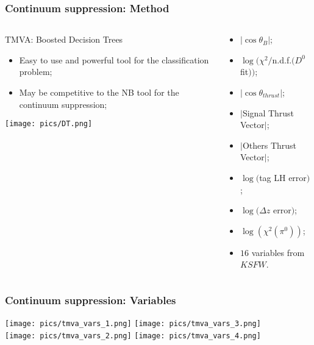 \documentclass[10 pt,compress,mathserif]{beamer}
\begin{document}
\begin{frame}[containsverbatim]
\frametitle{Continuum suppression: Method}
\begin{columns}
 \begin{column}{0.5\textwidth}
  \begin{block}{TMVA: Boosted Decision Trees}
  \begin{itemize}
   \item Easy to use and powerful tool for the classification problem;
   \item May be competitive to the NB tool for the continuum suppression;
  \end{itemize}
  \begin{center}
   \texttt{[image: pics/DT.png]}\\
  \end{center}
  \end{block}
 \end{column}
 \begin{column}{0.5\textwidth}
  \begin{itemize}
   \item $\left|\cos\theta_{B}\right|$;
   \item $\log(\chi^2/$n.d.f.$(D^0$ fit$))$;
   \item $\left|\cos\theta_{thrust}\right|$;
   \item $|$Signal Thrust Vector$|$;
   \item $|$Others Thrust Vector$|$;
   \item $\log($tag LH error$)$;
   \item $\log(\Delta z$ error$)$;
   \item $\log(\chi^2(\pi^0))$;
   \item $16$ variables from $KSFW$.
  \end{itemize}
 \end{column}
\end{columns}
\end{frame}

\begin{frame}
 \frametitle{Continuum suppression: Variables}
   \texttt{[image: pics/tmva\_vars\_1.png]} \texttt{[image: pics/tmva\_vars\_3.png]}\\
   \texttt{[image: pics/tmva\_vars\_2.png]} \texttt{[image: pics/tmva\_vars\_4.png]}
\end{frame}
\end{document}
